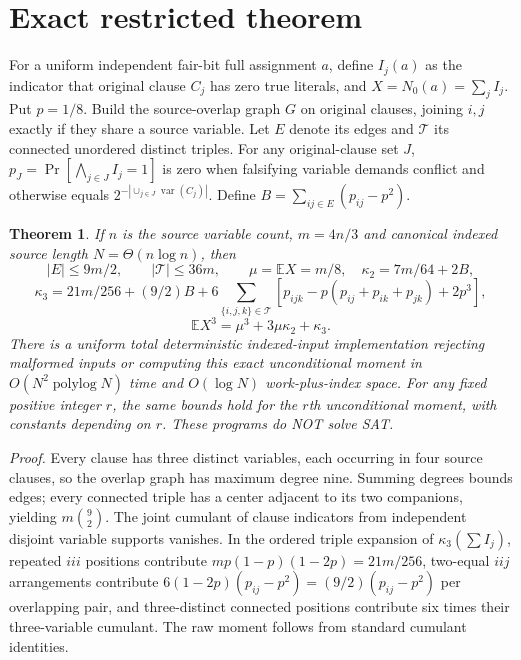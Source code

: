 \documentclass[11pt]{article}
\newtheorem{theorem}{Theorem}
\begin{document}
\section*{Exact restricted theorem}
For a uniform independent fair-bit full assignment $a$, define $I_j(a)$ as the indicator that original clause $C_j$ has zero true literals, and $X=N_0(a)=\sum_j I_j$. Put $p=1/8$. Build the source-overlap graph $G$ on original clauses, joining $i,j$ exactly if they share a source variable. Let $E$ denote its edges and $\mathcal T$ its connected unordered distinct triples. For any original-clause set $J$, $p_J=\Pr[\bigwedge_{j\in J}I_j=1]$ is zero when falsifying variable demands conflict and otherwise equals $2^{-|\cup_{j\in J}\operatorname{var}(C_j)|}$. Define $B=\sum_{ij\in E}(p_{ij}-p^2)$.
\begin{theorem}
If $n$ is the source variable count, $m=4n/3$ and canonical indexed source length $N=\Theta(n\log n)$, then
\[
|E|\le9m/2,\qquad|\mathcal T|\le36m,\qquad
\mu=\mathbb EX=m/8,\quad \kappa_2=7m/64+2B,
\]
\[
\kappa_3=21m/256+(9/2)B+
6\sum_{\{i,j,k\}\in\mathcal T}
[p_{ijk}-p(p_{ij}+p_{ik}+p_{jk})+2p^3],
\]
\[
\mathbb EX^3=\mu^3+3\mu\kappa_2+\kappa_3.
\]
There is a uniform total deterministic indexed-input implementation rejecting malformed inputs or computing this exact unconditional moment in $O(N^2\operatorname{polylog}N)$ time and $O(\log N)$ work-plus-index space. For any fixed positive integer $r$, the same bounds hold for the $r$th unconditional moment, with constants depending on $r$. These programs do NOT solve SAT.
\end{theorem}
\noindent\textit{Proof.}
Every clause has three distinct variables, each occurring in four source clauses, so the overlap graph has maximum degree nine. Summing degrees bounds edges; every connected triple has a center adjacent to its two companions, yielding $m\binom92$. The joint cumulant of clause indicators from independent disjoint variable supports vanishes. In the ordered triple expansion of $\kappa_3(\sum I_j)$, repeated $iii$ positions contribute $m p(1-p)(1-2p)=21m/256$, two-equal $iij$ arrangements contribute $6(1-2p)(p_{ij}-p^2)=(9/2)(p_{ij}-p^2)$ per overlapping pair, and three-distinct connected positions contribute six times their three-variable cumulant. The raw moment follows from standard cumulant identities.
\end{document}
